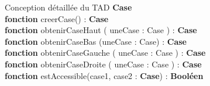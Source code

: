 \documentclass[12pt, a4 paper] {article}
\begin{document}
\begin{algorithm}
Conception détaillée du TAD \textbf{Case} \\
\textbf{fonction} creerCase() : \textbf{Case} \\
\textbf{fonction} obtenirCaseHaut ( uneCase : Case ) : \textbf{Case} \\
\textbf{fonction} obtenirCaseBas (uneCase : Case) : \textbf{Case}\\
\textbf{fonction} obtenirCaseGauche ( uneCase : Case ) : \textbf{Case}\\
\textbf{fonction} obtenirCaseDroite ( uneCase : Case ) : \textbf{Case}\\
\textbf{fonction} estAccessible(case1, case2 : \textbf{Case}) : \textbf{Booléen} 
\end{algorithm}
\end{document}
